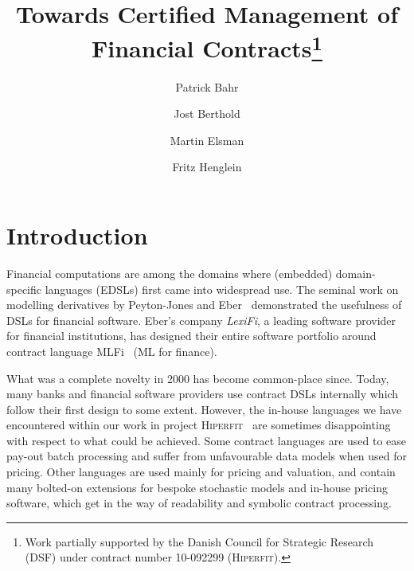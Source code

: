 \documentclass[a4paper,debug,twocolumn]{easychair}
\newcommand{\comm}[3][red]{{\small \color{#1}{$\spadesuit$#2: #3}}}
\newcommand{\jbcomment}[1]{\comm[orange]{jb}{#1}}
\theoremstyle{plain}
\begin{document}
\title{Towards Certified Management of Financial Contracts\thanks{Work
    partially supported by the Danish Council for Strategic Research
    (DSF) under contract number 10-092299 (\textsc{Hiperfit}).}}


\author{Patrick Bahr
    \and
        Jost Berthold 
    \and 
        Martin Elsman 
    \and 
        Fritz Henglein\\
}



\clearpage
\maketitle

\section{Introduction}

Financial computations are among the domains where (embedded)
domain-specific languages (EDSLs) first came into widespread use.  The
seminal work on modelling derivatives by Peyton-Jones and
Eber~\cite{SPJ2000} demonstrated the usefulness of DSLs for financial
software.
%
Eber's company \emph{LexiFi}, a leading software provider
for financial institutions, has designed their entire software portfolio
around contract language MLFi~\cite{MLFi} (ML for finance).

What was a complete novelty in 2000 has become common-place since.
Today, many banks and financial software providers use contract DSLs internally
which follow their first design to some extent.
However, the in-house languages we have encountered within our work in project
\textsc{Hiperfit}~\cite{TFP11Hiperfit} are sometimes disappointing with respect
to what could be achieved.
%
Some contract languages are used to ease pay-out batch processing and suffer
from unfavourable data models when used for pricing.
%
Other languages are used mainly for pricing and valuation, and contain many
bolted-on extensions for bespoke stochastic models and in-house pricing
software, which get in the way of readability and symbolic contract processing.
\jbcomment{tone down? how to substantiate it?}
\end{document}
